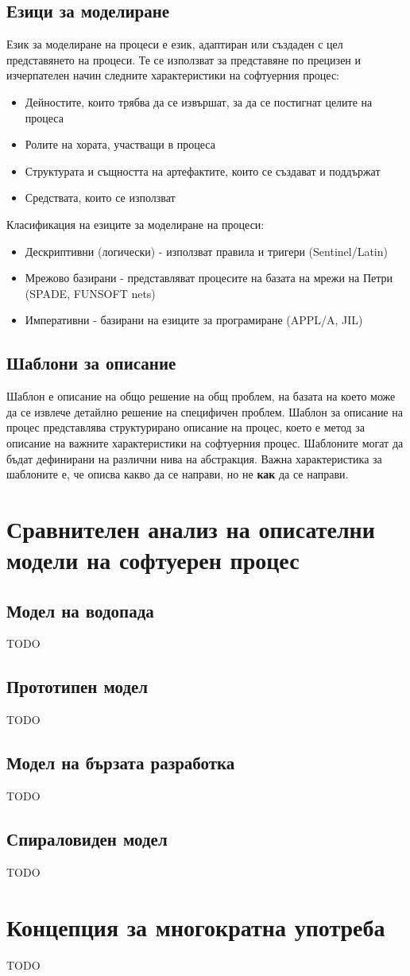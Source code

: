\documentclass[fleqn,12pt]{article}
\begin{document}
\subsection{Езици за  моделиране}
Език за моделиране на процеси е език, адаптиран или създаден с цел представянето на процеси. Те се използват за представяне по прецизен и изчерпателен начин следните характеристики на софтуерния процес:
 
\begin{itemize}
	\item Дейностите, които трябва да се извършат, за да се постигнат целите на процеса
	\item Ролите на хората, участващи в процеса
	\item Структурата и същността на артефактите, които се създават и поддържат
	\item Средствата, които се използват
\end{itemize}

Класификация на езиците за моделиране на процеси:
\begin{itemize}
	\item Дескриптивни (логически) - използват правила и тригери (Sentinel/Latin)
	\item Мрежово базирани - представляват процесите на базата на мрежи на Петри (SPADE, FUNSOFT nets)
	\item Императивни - базирани на езиците за програмиране (APPL/A, JIL)
\end{itemize}

\subsection{Шаблони за описание}
Шаблон е описание на общо решение на общ проблем, на базата на което може да се извлече детайлно решение на специфичен проблем.
Шаблон за описание на процес представлява структурирано описание на процес, което е метод за описание на важните характеристики на софтуерния процес. Шаблоните могат да бъдат дефинирани на различни нива на абстракция. Важна характеристика за шаблоните е, че описва какво да се направи, но не \textbf{как} да се направи.

\section{Сравнителен анализ на описателни модели на софтуерен процес}
\subsection{Модел на водопада}
TODO

\subsection{Прототипен модел}
TODO

\subsection{Модел на бързата разработка}
TODO

\subsection{Спираловиден модел}
TODO

\section{Концепция за многократна употреба}
TODO
\end{document}
